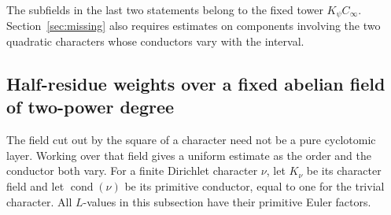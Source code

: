 \documentclass[a4paper,11pt]{article}
\theoremstyle{definition}
\theoremstyle{remark}
\numberwithin{equation}{section}
\begin{document}
The subfields in the last two statements belong to the fixed
tower \(K_\psi C_\infty\). Section~\ref{sec:missing} also
requires estimates on components involving the two quadratic
characters whose conductors vary with the interval.




\subsection{Half-residue weights over a fixed abelian field of two-power degree}
\label{sec:mixedhalf633}

The field cut out by the square of a character need not be a pure
cyclotomic layer. Working over that field gives a uniform estimate as
the order and the conductor both vary. For a finite Dirichlet character
\(\nu\), let \(K_\nu\) be its character field and let
\(\operatorname{cond}(\nu)\) be its primitive conductor, equal to one
for the trivial character. All \(L\)-values in this subsection have
their primitive Euler factors.
\end{document}
